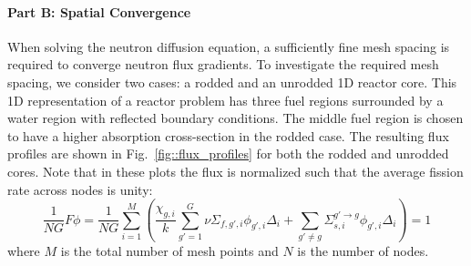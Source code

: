 \documentclass[12pt]{report}
\begin{document}
	\newpage
	\paragraph{Part B: Spatial Convergence}
	When solving the neutron diffusion equation, a sufficiently fine mesh spacing is required to converge neutron flux gradients. To investigate the required mesh spacing, we consider two cases: a rodded and an unrodded 1D reactor core. This 1D representation of a reactor problem has three fuel regions surrounded by a water region with reflected boundary conditions. The middle fuel region is chosen to have a higher absorption cross-section in the rodded case. The resulting flux profiles are shown in Fig.~\ref{fig::flux_profiles} for both the rodded and unrodded cores. Note that in these plots the flux is normalized such that the average fission rate across nodes is unity:
	\begin{equation}
	\frac{1}{NG} F \phi = \frac{1}{NG} \sum_{i=1}^{M} \left( \frac{\chi_{g,i}}{k} \sum_{g'=1}^{G} \nu \Sigma_{f,g',i} \phi_{g',i} \Delta_i + \sum_{g'\neq g} \Sigma_{s,i}^{g' \rightarrow g} \phi_{g',i} \Delta_i \right) = 1
	\end{equation}
	where $M$ is the total number of mesh points and $N$ is the number of nodes.
\end{document}
